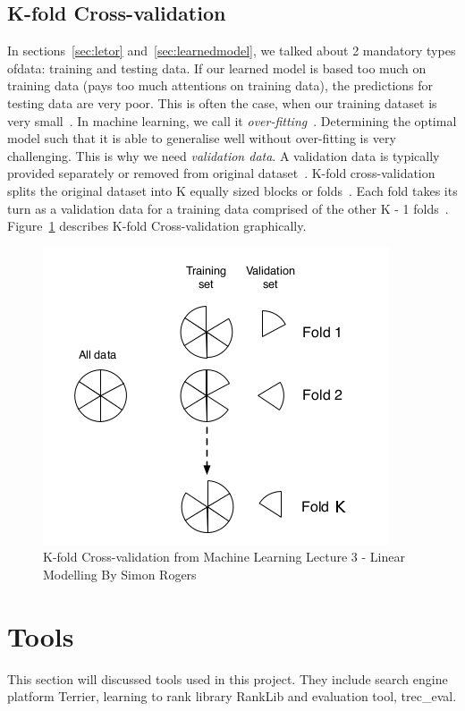 \subsection{K-fold Cross-validation}\label{sec:kfold}
In sections~\ref{sec:letor} and~\ref{sec:learnedmodel}, we talked about 2 mandatory types ofdata: training and testing data. If our learned model is based too much on 
training data (pays too much attentions on training data), the predictions for testing data are very poor. This is often the case, when our training dataset
is very small~\cite{mlSimon}. In machine learning, we call 
it \textit{over-fitting}~\cite[P. 28]{mlSimon}. Determining the optimal model such that it is able to generalise well without over-fitting is very challenging.
This is why we need \textit{validation data}. A validation data is typically provided separately or removed from original dataset~\cite{craig}.
K-fold cross-validation splits the original dataset into K equally sized blocks or folds~\cite{mlSimon}. Each fold takes its turn as a validation data for a
training data comprised of the other K - 1 folds~\cite{mlSimon}. Figure~\ref{fig:crossvalidation} describes K-fold Cross-validation graphically.
\begin{figure}
\centering
\includegraphics[scale=0.4]{./figures/validation.png}
\caption{K-fold Cross-validation from Machine Learning Lecture 3 - Linear Modelling By Simon Rogers}\label{fig:crossvalidation} 
\end{figure}

\section{Tools}
This section will discussed tools used in this project. They include search engine platform Terrier, learning to rank library RankLib and evaluation tool,
trec\_eval.

